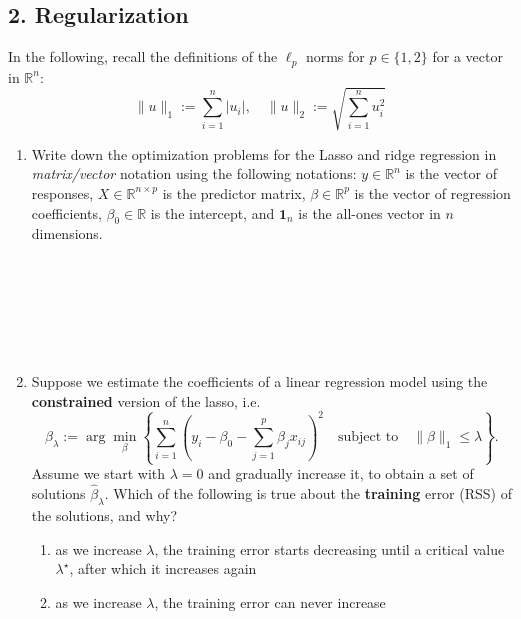\documentclass{article}
\begin{document}
\subsection*{2. Regularization}
In the following, recall the definitions of the $\ell_p$ norms for $p \in \{1,
2\}$ for a vector in $\mathbb{R}^n$:
\begin{equation}
    \| u \|_1 := \sum_{i = 1}^n |u_i|, \quad
    \| u \|_2 := \sqrt{\sum_{i = 1}^n u_i^2}
\end{equation}

\begin{enumerate}
\item Write down the optimization problems for the Lasso and ridge regression
in \textit{matrix/vector} notation using the following notations: $y \in
\mathbb{R}^n$ is the vector of responses, $X \in \mathbb{R}^{n \times p}$ is
the predictor matrix, $\beta \in \mathbb{R}^p$ is the vector of regression
coefficients, $\beta_0 \in \mathbb{R}$ is the intercept, and $\mathbf{1}_n$
is the all-ones vector in $n$ dimensions.
\begin{Verbatim}[frame=single]







\end{Verbatim}
\item Suppose we estimate the coefficients of a linear regression model using
the \textbf{constrained} version of the lasso, i.e.
\[
    \hat{\beta}_{\lambda} := \arg \min_{\beta} \left\{
    \sum_{i = 1}^n \left(y_i - \beta_0 - \sum_{j=1}^p \beta_j x_{ij}\right)^2
    \quad \mbox{subject to} \quad \| \beta \|_1 \leq \lambda
    \right\}.
\]
Assume we start with $\lambda = 0$ and gradually increase it, to obtain a
set of solutions $\hat{\beta}_{\lambda}$. Which of the following is true about
the \textbf{training} error (RSS) of the solutions, and why?
\begin{enumerate}
\item as we increase $\lambda$, the training error starts decreasing until a
critical value $\lambda^{\star}$, after which it increases again
\label{item:lasso-1}
\item as we increase $\lambda$, the training error can never increase
\end{enumerate}
\begin{Verbatim}[frame=single]





\end{Verbatim}


\end{enumerate}
\end{document}
